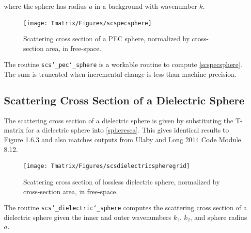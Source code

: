 \noindent where the sphere has radius $a$ in a background with wavenumber $k$.

\begin{figure}[H] 
   \centering
   \texttt{[image: Tmatrix/Figures/scspecsphere]} 
   \caption{Scattering cross section of a PEC sphere, normalized by cross-section area, in free-space.}
   \label{scspecsph}
\end{figure}




The routine \texttt{scs\char`_pec\char`_sphere} is a workable routine to compute \eqref{scspecsphere}. The sum is truncated when incremental change is less than machine precision. 

{\footnotesize
{}
}
\clearpage
\subsection{Scattering Cross Section of a Dielectric Sphere}

The scattering cross section of a dielectric sphere is given by substituting the T-matrix for a dielectric sphere into \eqref{spheresca}. This gives identical results to \cite{tsang2000scattering} Figure 1.6.3 and also matches outputs from Ulaby and Long 2014 Code Module 8.12.


\begin{figure}[H] 
   \centering
   \texttt{[image: Tmatrix/Figures/scsdielectricspheregrid]} 
   \caption{Scattering cross section of lossless dielectric sphere, normalized by cross-section area, in free-space.}
      \label{scsdiesphall}
\end{figure}


The routine \texttt{scs\char`_dielectric\char`_sphere} computes the scattering cross section of a dielectric sphere given the inner and outer wavenumbers $k_1$, $k_2$, and sphere radius $a$.  

{\scriptsize
{}
}

